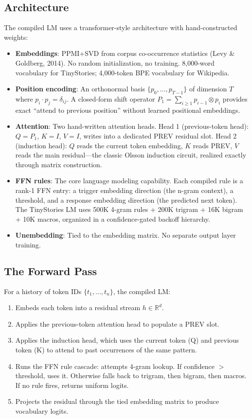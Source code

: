 \documentclass[11pt,a4paper]{article}
\begin{document}
\subsection{Architecture}

The compiled LM uses a transformer-style architecture with hand-constructed weights:

\begin{itemize}[leftmargin=*]
\item \textbf{Embeddings}: PPMI+SVD from corpus co-occurrence statistics (Levy \& Goldberg, 2014). No random initialization, no training. 8,000-word vocabulary for TinyStories; 4,000-token BPE vocabulary for Wikipedia.
\item \textbf{Position encoding}: An orthonormal basis $\{p_0, \ldots, p_{T-1}\}$ of dimension $T$ where $p_i \cdot p_j = \delta_{ij}$. A closed-form shift operator $P_1 = \sum_{i \geq 1} p_{i-1} \otimes p_i$ provides exact ``attend to previous position'' without learned positional embeddings.
\item \textbf{Attention}: Two hand-written attention heads. Head 1 (previous-token head): $Q = P_1$, $K = I$, $V = I$, writes into a dedicated PREV residual slot. Head 2 (induction head): $Q$ reads the current token embedding, $K$ reads PREV, $V$ reads the main residual---the classic Olsson induction circuit, realized exactly through matrix construction.
\item \textbf{FFN rules}: The core language modeling capability. Each compiled rule is a rank-1 FFN entry: a trigger embedding direction (the n-gram context), a threshold, and a response embedding direction (the predicted next token). The TinyStories LM uses 500K 4-gram rules + 200K trigram + 16K bigram + 10K macros, organized in a confidence-gated backoff hierarchy.
\item \textbf{Unembedding}: Tied to the embedding matrix. No separate output layer training.
\end{itemize}

\subsection{The Forward Pass}

For a history of token IDs $\{t_1, \ldots, t_n\}$, the compiled LM:

\begin{enumerate}[leftmargin=*]
\item Embeds each token into a residual stream $h \in \mathbb{R}^d$.
\item Applies the previous-token attention head to populate a PREV slot.
\item Applies the induction head, which uses the current token (Q) and previous token (K) to attend to past occurrences of the same pattern.
\item Runs the FFN rule cascade: attempts 4-gram lookup. If confidence $>$ threshold, uses it. Otherwise falls back to trigram, then bigram, then macros. If no rule fires, returns uniform logits.
\item Projects the residual through the tied embedding matrix to produce vocabulary logits.
\end{enumerate}
\end{document}
